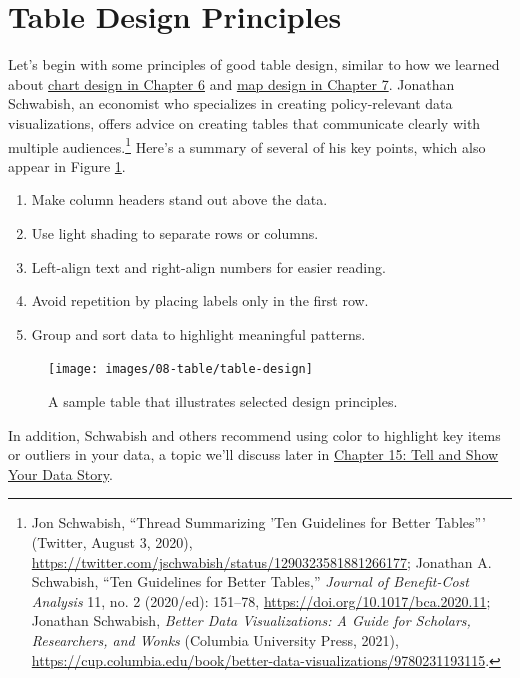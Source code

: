 \documentclass[
  english,
]{book}
\begin{document}
\hypertarget{table-design}{%
\section*{Table Design Principles}\label{table-design}}

Let's begin with some principles of good table design, similar to how we learned about \href{chart-design.html}{chart design in Chapter 6} and \href{map-design.html}{map design in Chapter 7}. Jonathan Schwabish, an economist who specializes in creating policy-relevant data visualizations, offers advice on creating tables that communicate clearly with multiple audiences.\footnote{Jon Schwabish, {``Thread {Summarizing} '{Ten Guidelines} for {Better Tables}'''} ({Twitter}, August 3, 2020), \url{https://twitter.com/jschwabish/status/1290323581881266177}; Jonathan A. Schwabish, {``Ten {Guidelines} for {Better Tables},''} \emph{Journal of Benefit-Cost Analysis} 11, no. 2 (2020/ed): 151--78, \url{https://doi.org/10.1017/bca.2020.11}; Jonathan Schwabish, \emph{Better {Data Visualizations}: {A Guide} for {Scholars}, {Researchers}, and {Wonks}} ({Columbia University Press}, 2021), \url{https://cup.columbia.edu/book/better-data-visualizations/9780231193115}.} Here's a summary of several of his key points, which also appear in Figure \ref{fig:table-design}.

\begin{enumerate}
\def\labelenumi{\arabic{enumi}.}
\item
  Make column headers stand out above the data.
\item
  Use light shading to separate rows or columns.
\item
  Left-align text and right-align numbers for easier reading.
\item
  Avoid repetition by placing labels only in the first row.
\item
  Group and sort data to highlight meaningful patterns.
\end{enumerate}



\begin{figure}
\texttt{[image: images/08-table/table-design]} \caption{A sample table that illustrates selected design principles.}\label{fig:table-design}
\end{figure}

In addition, Schwabish and others recommend using color to highlight key items or outliers in your data, a topic we'll discuss later in \href{story.html}{Chapter 15: Tell and Show Your Data Story}.
\end{document}
